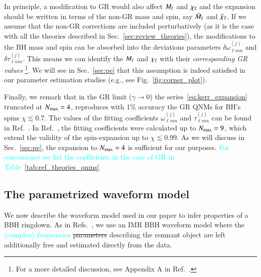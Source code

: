 \documentclass[twocolumn,
               prd,
               aps,
               superscriptaddress,
               tightenlines,
               nofootinbib,
               eqsecnum,
               amsfonts,
               amsmath,
               longbibliography]{revtex4-1}
\newcommand{\ab}[1]{{\textcolor{cyan}{{#1}} }}
\begin{document}
In principle, a modification to GR would also affect $M_{\rm f}$ and $\chi_{\rm f}$ and the
expansion should be written in terms of the non-GR mass and spin, say $\bar{M}_{\rm f}$ and
$\bar{\chi}_{\rm f}$. If we assume that the non-GR corrections are included perturbatively
(as it is the case with all the theories described in Sec.~\ref{sec:review_theories}),
the modifications to the BH mass and spin can be absorbed into the deviations
parameters $\delta\omega^{(j)}_{\ell m n}$ and $\delta\tau^{(j)}_{\ell m n}$.
%
This means we can identify the $M_{\rm f}$ and $\chi_{\rm f}$ with their \emph{corresponding {\rm GR} values}
\footnote{For a more detailed discussion, see Appendix A in Ref.~\cite{Maselli:2019mjd}.}.
%
We will see in Sec.~\ref{sec:pe}  that this assumption is indeed
satisfied in our parameter estimation studies (e.g., see Fig.~\ref{fig:corner_plot}).

Finally, we remark that in the GR limit ($\gamma \to 0$)
the series~\eqref{eq:kerr_expansion} truncated at $N_{\rm max} = 4$, reproduces with 1\% accuracy
the GR QNMs for BH's spins $\chi \lesssim 0.7$.
%
The values of the fitting coefficients $\omega_{\ell m n}^{(j)}$ and $\tau_{\ell m n}^{(j)}$
can be found in Ref.~\cite{Maselli:2019mjd}. 
%
In Ref.~\cite{Carullo:2021dui}, the fitting coefficients were calculated up to $N_{\rm max} = 9$,
which extend the validity of the spin-expansion up to $\chi \lesssim 0.99$.
%
As we will discuss in Sec.~\ref{sec:pe}, the expansion to $N_{\rm max} = 4$ is
sufficient for our purposes. \ab{For convenience we list the coefficients in the case of 
GR in Table~\ref{tab:ref_theories_qnms}.}

\subsection{The parametrized waveform model}
\label{sec:review_pSEOB}

We now describe the waveform model used in our paper to infer properties of a
BBH ringdown. 
%
As in Refs.~\cite{Brito:2018rfr,Ghosh:2021mrv}, we use an IMR BBH waveform
model where the \ab{(complex) frequencies} \sout{parameters} describing the remnant object 
are left additionally free and estimated directly from the data.
\end{document}
